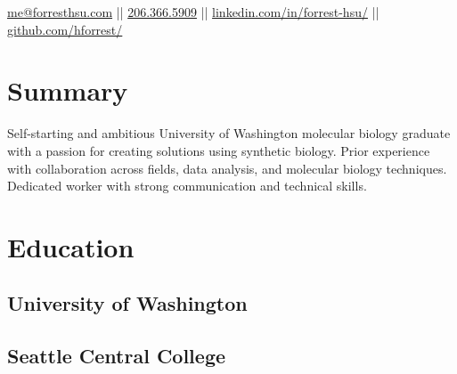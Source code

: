 \documentclass[]{forrest-resume-interfont}
\begin{document}
%
%

\lastupdated



%
%

{
	\href{mailto:me@forresthsu.com}{me@forresthsu.com} || 
	\href{tel:2063665909}{206.366.5909} || 
	\href{https://www.linkedin.com/in/forrest-hsu/}{linkedin.com/in/forrest-hsu/} ||
	\href{https://github.com/HForrest/}{github.com/hforrest/}
}

\spacesep
\section{ Summary}
\raggedright %
Self-starting and ambitious University of Washington molecular biology graduate with a passion for creating solutions using synthetic biology. 
Prior experience with collaboration across fields, data analysis, and molecular biology techniques.
Dedicated worker with strong communication and technical skills. 
\linesep


\section{ Education}
\subsection{University of Washington}
\spacesep
\subsection{Seattle Central College}

\linesep
\end{document}
